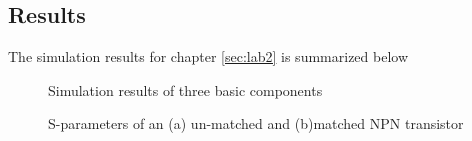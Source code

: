 \documentclass[report.tex]{subfiles}
\begin{document}
\clearpage
\subsection{Results}
\label{sec:lab2_results}
The simulation results for chapter \ref{sec:lab2} is summarized below

\vspace*{\fill}
\begin{figure}[h]
    \centering
    \caption{Simulation results of three basic components}
\end{figure}
\vspace*{\fill}

\clearpage

\begin{figure}
    \centering
    \caption{S-parameters of an (a) un-matched and (b)matched NPN transistor}
\end{figure}

%
\end{document}
